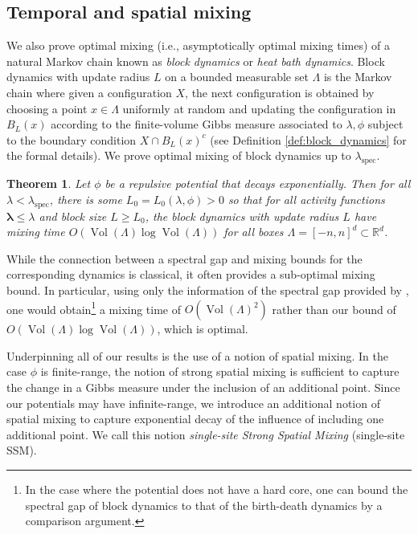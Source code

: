 \documentclass[10pt]{amsart}
\newtheorem{theorem}{Theorem}[section]
\theoremstyle{definition}
\theoremstyle{remark}
\newcommand{\spec}{{\mathrm{spec}}}
\newcommand{\Vol}{\operatorname{Vol}}
\newcommand{\blambda}{{\boldsymbol{\lambda}}}
\newcommand{\R}{\mathbb{R}}
\begin{document}
	
	\subsection{Temporal and spatial mixing}
	
	
	
	We also prove optimal mixing (i.e., asymptotically optimal mixing times) of a natural Markov chain known as \emph{block dynamics} or \emph{heat bath dynamics}.  Block dynamics with update radius $L$ on a bounded measurable set $\Lambda$ is the Markov chain where given a configuration $X$, the next configuration is obtained by choosing a point $x \in \Lambda$ uniformly at random and updating the configuration in $B_L(x)$ according to the finite-volume Gibbs measure associated to $\lambda,\phi$ subject to the boundary condition $X \cap B_L(x)^c$ (see Definition \ref{def:block_dynamics} for the formal details).  We prove optimal mixing of block dynamics up to $\lambda_{\spec}$.
	
	\begin{theorem}\label{thm:block-dynamics}
		Let $\phi$ be a repulsive potential that decays exponentially.  Then for all $\lambda < \lambda_{\spec}$, there is some $L_0 = L_0(\lambda,\phi) > 0$ so that for all activity functions $\blambda \leq \lambda$ and block size $L \geq L_0$, the block dynamics with update radius $L$ have mixing time $O(\Vol(\Lambda) \log \Vol(\Lambda) )$ for all boxes $\Lambda = [-n,n]^d \subset \R^d$.
	\end{theorem}
	
	While the connection between a spectral gap and mixing bounds for the corresponding dynamics is classical, it often provides a sub-optimal mixing bound.  In particular, using only the information of the spectral gap provided by \cite{kondratiev2013spectral}, one would obtain\footnote{In the case where the potential does not have a hard core, one can bound the spectral gap of block dynamics to that of the birth-death dynamics by a comparison argument.} a mixing time of $O(\Vol(\Lambda)^2)$ rather than our bound of  $O(\Vol(\Lambda) \log \Vol(\Lambda))$, which is optimal. 
	
	
	Underpinning all of our results is the use of a notion of spatial mixing.  In the case $\phi$ is finite-range, the notion of strong spatial mixing is sufficient to capture the change in a Gibbs measure under the inclusion of an additional point.  Since our potentials may have infinite-range, we introduce an additional notion of spatial mixing to capture exponential decay of the influence of including one additional point.  We call this notion \emph{single-site Strong Spatial Mixing} (single-site SSM). 
	
\end{document}
